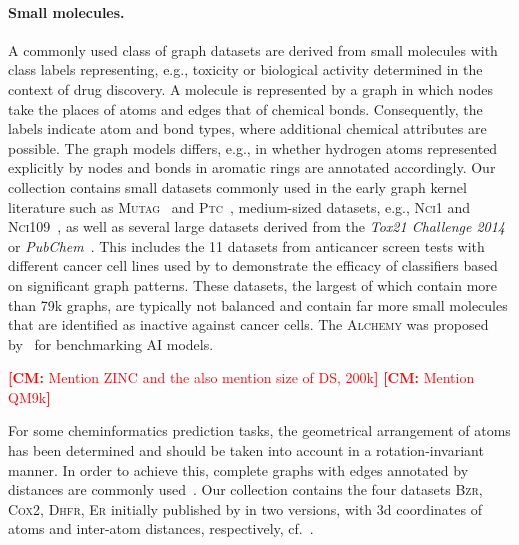 \documentclass{article}
\theoremstyle{definition}
\newcommand{\cm}[1]{{{\textcolor{red}{\textbf{[CM:} {#1}\textbf{]}}}}}
\begin{document}
\paragraph{Small molecules.} 
A commonly used class of graph datasets are derived from small molecules with class labels representing, e.g., toxicity or biological activity determined in the context of drug discovery. A molecule is represented by a graph in which nodes take the places of atoms and edges that of chemical bonds. Consequently, the labels indicate atom and bond types, where additional chemical attributes are possible. The graph models differs, e.g., in whether hydrogen atoms represented explicitly by nodes and bonds in aromatic rings are annotated accordingly.
Our collection contains small datasets commonly used in the early graph kernel literature such as \textsc{Mutag}~\citep{Deb+1991} and \textsc{Ptc}~\cite{Helma2001}, medium-sized datasets, e.g., \textsc{Nci1} and \textsc{Nci109}~\citep{Wal+2008,She+2011}, as well as several large datasets derived from the \emph{Tox21 Challenge 2014} or \emph{PubChem}~\citep{Kim2018}. This includes the 11 datasets from anticancer screen tests with different cancer cell lines used by \citet{Yan2008} to demonstrate the efficacy of classifiers based on significant graph patterns. These datasets, the largest of which contain more than 79k graphs, are typically not balanced and contain far more small molecules that are identified as inactive against cancer cells.
The \textsc{Alchemy} was proposed by~\citet{Chen2019a} for benchmarking {AI} models.

\cm{Mention \textsc{ZINC} and the also mention size of DS, 200k}
\cm{Mention \textsc{QM9}k}

For some cheminformatics prediction tasks, the geometrical arrangement of atoms has been determined and should be taken into account in a rotation-invariant manner. In order to achieve this, complete graphs with edges annotated by distances are commonly used~\citep{Kri+2012,Gil+2017}. Our collection contains the four datasets \textsc{Bzr}, \textsc{Cox2}, \textsc{Dhfr}, \textsc{Er} initially published by \citet{Sut+2003} in two versions, with 3d coordinates of atoms and inter-atom distances, respectively, cf.~\citep{Mah+2006,Kri+2012}.
\end{document}
